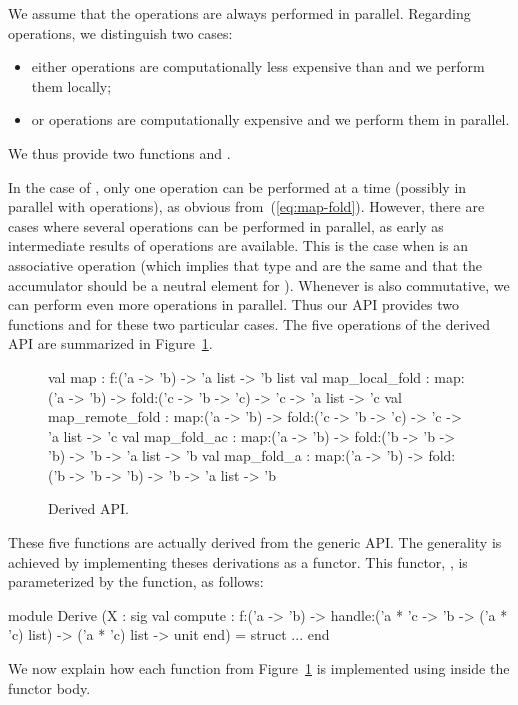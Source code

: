 \documentclass[preprint]{sigplanconf}
\begin{document}
We assume that the  operations are always performed in parallel.
Regarding  operations, we distinguish two cases:
\begin{itemize}
\item either  operations are computationally less expensive
  than  and we perform them locally;
\item or  operations are computationally expensive and we
  perform them in parallel.
\end{itemize}
We thus provide two functions  and .

In the case of , only one  operation can
be performed at a time (possibly in parallel with 
operations), as obvious from~(\ref{eq:map-fold}). However, there are
cases where several  operations can be performed in parallel,
as early as intermediate results of  operations are available.
This is the case when  is an associative operation (which
implies that type  and  are the same  and that the
accumulator should be a neutral element for ). Whenever
 is also commutative, we can perform even more 
operations in parallel. Thus our API provides two functions
 and  for these two particular cases.
The five operations of the derived API are summarized
in Figure~\ref{fig:derived}.
\begin{figure}[t]
  \begin{ocaml}
    val map : 
      f:('a -> 'b) -> 'a list -> 'b list 
    val map_local_fold : 
      map:('a -> 'b) -> fold:('c -> 'b -> 'c) -> 
      'c -> 'a list -> 'c 
    val map_remote_fold : 
      map:('a -> 'b) -> fold:('c -> 'b -> 'c) -> 
      'c -> 'a list -> 'c 
    val map_fold_ac : 
      map:('a -> 'b) -> fold:('b -> 'b -> 'b) -> 
      'b -> 'a list -> 'b 
    val map_fold_a : 
      map:('a -> 'b) -> fold:('b -> 'b -> 'b) -> 
      'b -> 'a list -> 'b
  \end{ocaml}
  \caption{Derived API.}
\label{fig:derived}
\end{figure}

These five functions are actually derived from the generic API.
The generality is achieved by implementing theses derivations as a functor.
This functor, , is parameterized by the 
function, as follows:
\begin{ocaml}
module Derive
  (X : sig
     val compute : 
       f:('a -> 'b) -> 
       handle:('a * 'c -> 'b -> ('a * 'c) list) ->
       ('a * 'c) list -> unit
   end) = struct ... end
\end{ocaml}
We now explain how each function from Figure~\ref{fig:derived} is
implemented using  inside the functor body.
\end{document}
